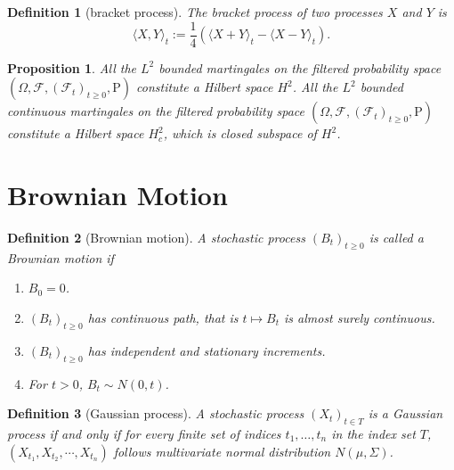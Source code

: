 \documentclass{article}
\newtheorem{definition}{Definition}[section]
\newtheorem{proposition}{Proposition}[section]
\theoremstyle{nonumberplain}
\begin{document}
\begin{definition}[bracket process]	
	The bracket process of two processes $X$ and $Y$ is
	\[
	\langle X, Y\rangle_{t}:=\frac{1}{4}\left(\langle X+Y\rangle_{t}-\langle X-Y\rangle_{t}\right).
	\] 
\end{definition}

\begin{proposition}
	All the $L^2$ bounded martingales on the filtered probability space $(\Omega,\mathcal{F},(\mathcal{F}_{t})_{t\ge0},\mathrm{P})$ constitute a Hilbert space $H^2$. All the $L^2$ bounded continuous martingales on the filtered probability space $(\Omega,\mathcal{F},(\mathcal{F}_{t})_{t\ge0},\mathrm{P})$ constitute a Hilbert space $H^2_c$, which is closed subspace of $H^2$.
\end{proposition}








\section{Brownian Motion}
\begin{definition}[Brownian motion]
	A stochastic process $(B_t)_{t\ge0}$ is called a \emph{Brownian motion} if
	\begin{enumerate}
		\item $B_0=0$.
		\item $(B_t)_{t\ge0}$ has continuous path, that is $t\mapsto B_t$ is almost surely continuous.
		\item $(B_t)_{t\ge0}$ has independent and stationary increments.
		\item For $t>0$, $B_t\sim N(0,t)$.
	\end{enumerate}
\end{definition}

\begin{definition}[Gaussian process]
A stochastic process $(X_t)_{t\in T}$ is a \emph{Gaussian process} if and only if for every finite set of indices $t_{1},\ldots ,t_{n}$ in the index set $T$, $(X_{t_1},X_{t_2},\cdots,X_{t_n})$ follows multivariate normal distribution $N(\mu,\Sigma)$.
\end{definition}
\end{document}
